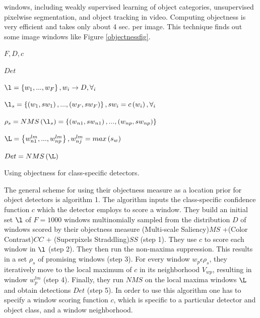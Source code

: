 windows, including weakly supervised learning of object categories, unsupervised pixelwise segmentation, and object tracking in video.
Computing objectness is very efficient and takes only about 4 sec. per image. This technique finds out some image windows like Figure \ref{objectnessfig}.\\
\begin{algorithm}
\SetAlgoLined
\centering
\begin{description}\itemsep0pt \parskip0pt  \vspace{.1cm}
  
  \item[Input:] \(F, D, c\) 
  \item[Ouput:] \(Det\)
  \item[Step 1:] \( \l = \left \{ w_{1},...,w_{F} \right \}, w_{i}\rightarrow D, \forall_{i} \)
  \item[Step 2:] \( \l_{s} = \left \{ \left ( w_{1},sw_{1} \right ),...,\left ( w_{F},sw_{F} \right )  \right \}, sw_{i}= c\left ( w_{i} \right ), \forall_{i} \) 
  \item[Step 3:] \( \rho _{s} = NMS\left ( \l_{s} \right )=\left \{ \left ( w_{n1},sw_{n1} \right ),...,\left ( w_{np},sw_{np} \right )  \right \}\)
  \item[Step 4:] \(\L=\left \{ w_{n1}^{lm},..., w_{np}^{lm} \right \}, w_{nj}^{lm} = max \left ( s_{w} \right )\)
  \item[Step 5:] \(Det = NMS\left ( \L \right )\)
\end{description}
\caption{Using objectness for class-specific detectors.}
\end{algorithm}
The general scheme for using their objectness measure as
a location prior for object detectors is algorithm 1. The
algorithm inputs the class-specific confidence function \(c\) which
the detector employs to score a window.
They build an initial set \(\l\) of \(F = 1000\) windows multinomially sampled from the distribution \(D\) of windows scored by
their objectness measure (Multi-scale Saliency)\(MS\) +(Color Contrast)\(CC\) + (Superpixels Straddling)\(SS\) (step 1). They use \(c\) to
score each window in \(\l\) (step 2). They then run the non-maxima
suppression. This results in a set \(\rho_{s}\) of promising
windows (step 3). For every window \(w_{p} \epsilon \rho_{s}\), they iteratively
move to the local maximum of \(c\) in its neighborhood \(V_{w
p}\),
resulting in window \(w_{p}^{lm}\) (step 4). Finally, they run \(NMS\) on the
local maxima windows \(\L\) and obtain detections \(Det\) (step 5).
In order to use this algorithm one has to specify a window
scoring function \(c\), which is specific to a particular detector
and object class, and a window neighborhood.

